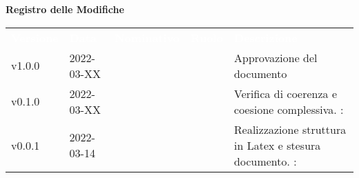 

{\LARGE{\textbf{Registro delle Modifiche}}} \\
\begin{table}[!htbp]
	\renewcommand{\arraystretch}{1.5}
	\begin{tabular}{ m{}<{\centering}  m{}<{\centering}  m{}<{\centering}  m{}<{\centering}  m{}<{\centering} }
		\rowcolor{darkblue}
		\textcolor{white}{\textbf{Versione}} & \textcolor{white}{\textbf{Data}} & \textcolor{white}{\textbf{Nominativo}} & \textcolor{white}{\textbf{Ruolo}} & \textcolor{white}{\textbf{Descrizione}}                              \\
		v1.0.0                               & 2022-03-XX                       &                                        & \RE                               & Approvazione del documento                                           \\

		v0.1.0                               & 2022-03-XX                       & \PV                                    & \AN                               & Verifica di coerenza e coesione complessiva. \VE: \textit{\GC}          \\

		v0.0.1                               & 2022-03-14                       & \PV                                    & \AN                               & Realizzazione struttura in Latex e stesura documento. \VE: \textit{\GC} \\
	\end{tabular}
\end{table}

\pagebreak